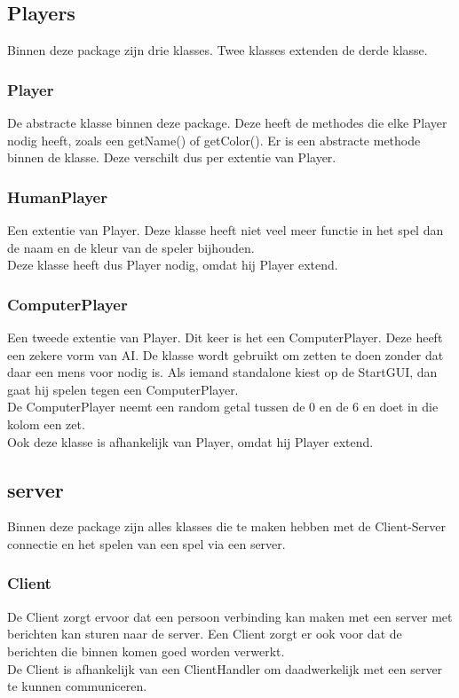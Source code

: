 \documentclass[12pt]{article}
\begin{document}
\subsection{Players}
Binnen deze package zijn drie klasses. Twee klasses extenden de derde klasse.
\subsubsection{Player}
De abstracte klasse binnen deze package. Deze heeft de methodes die elke Player nodig heeft, zoals een getName() of getColor(). Er is een abstracte methode binnen de klasse. Deze verschilt dus per extentie van Player. 
\subsubsection{HumanPlayer}
Een extentie van Player. Deze klasse heeft niet veel meer functie in het spel dan de naam en de kleur van de speler bijhouden.\\
Deze klasse heeft dus Player nodig, omdat hij Player extend.
\subsubsection{ComputerPlayer}
Een tweede extentie van Player. Dit keer is het een ComputerPlayer. Deze heeft een zekere vorm van AI. De klasse wordt gebruikt om zetten te doen zonder dat daar een mens voor nodig is. Als iemand standalone kiest op de StartGUI, dan gaat hij spelen tegen een ComputerPlayer.\\
De ComputerPlayer neemt een random getal tussen de 0 en de 6 en doet in die kolom een zet.\\
Ook deze klasse is afhankelijk van Player, omdat hij Player extend.
\subsection{server}
Binnen deze package zijn alles klasses die te maken hebben met de Client-Server connectie en het spelen van een spel via een server.
\subsubsection{Client}
De Client zorgt ervoor dat een persoon verbinding kan maken met een server met berichten kan sturen naar de server. Een Client zorgt er ook voor dat de berichten die binnen komen goed worden verwerkt.\\
De Client is afhankelijk van een ClientHandler om daadwerkelijk met een server te kunnen communiceren.
\end{document}
